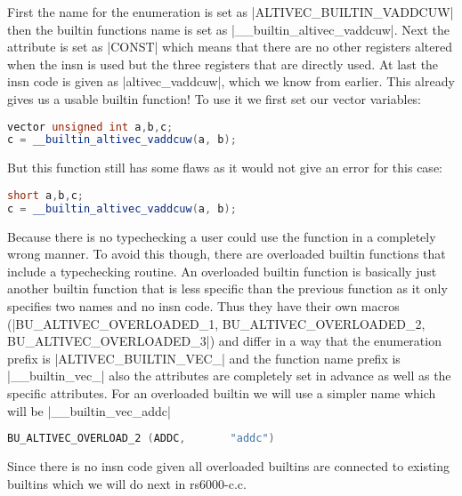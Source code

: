 First the name for the enumeration is set as |ALTIVEC_BUILTIN_VADDCUW| then the builtin functions name is set as |__builtin_altivec_vaddcuw|. Next the attribute is set as |CONST| which means that there are no other registers altered when the insn is used but the three registers that are directly used. At last the insn code is given as |altivec_vaddcuw|, which we know from earlier. This already gives us a usable builtin function! To use it we first set our vector variables:
\begin{lstlisting}[language=C++,basicstyle=\ttfamily\scriptsize,keywordstyle=\color{red}]
vector unsigned int a,b,c;
c = __builtin_altivec_vaddcuw(a, b);
\end{lstlisting}
But this function still has some flaws as it would not give an error for this case:
\begin{lstlisting}[language=C++,basicstyle=\ttfamily\scriptsize,keywordstyle=\color{red}]
short a,b,c;
c = __builtin_altivec_vaddcuw(a, b);
\end{lstlisting}
Because there is no typechecking a user could use the function in a completely wrong manner. To avoid this though, there are overloaded builtin functions that include a typechecking routine.
An overloaded builtin function is basically just another builtin function that is less specific than the previous function as it only specifies two names and no insn code. Thus they have their own macros (|BU_ALTIVEC_OVERLOADED_1, BU_ALTIVEC_OVERLOADED_2, BU_ALTIVEC_OVERLOADED_3|) and differ in a way that the enumeration prefix is |ALTIVEC_BUILTIN_VEC_| and the function name prefix is |__builtin_vec_| also the attributes are completely set in advance as well as the specific attributes.
For an overloaded builtin we will use a simpler name which will be  |__builtin_vec_addc|

\begin{lstlisting}[language=C++,basicstyle=\ttfamily\scriptsize,keywordstyle=\color{red}]
BU_ALTIVEC_OVERLOAD_2 (ADDC,	   "addc")
\end{lstlisting}
Since there is no insn code given all overloaded builtins are connected to existing builtins which we will do next in rs6000-c.c.

